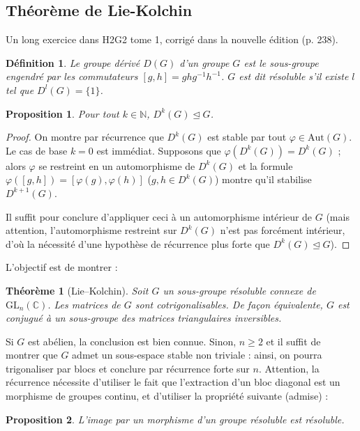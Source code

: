 \documentclass[a4paper, 11pt]{article}
\def\N{\mathbb{N}}
\def\C{\mathbb{C}}
\def\GL{\mathrm{GL}}
\def\Aut{\mathrm{Aut}}
\newtheorem*{definition}{Définition}
\newtheorem*{proposition}{Proposition}
\newtheorem*{theorem}{Théorème}
\begin{document}
\subsection{Théorème de Lie-Kolchin}

Un long exercice dans H2G2 tome 1, corrigé dans la nouvelle édition (p. 238).

\begin{definition}
  Le \emph{groupe dérivé} $D(G)$ d'un groupe $G$ est le sous-groupe engendré par
  les commutateurs $[g,h]= ghg^{-1}h^{-1}$. $G$ est dit \emph{résoluble} s'il
  existe $l$ tel que $D^l(G) = \{1\}$.
\end{definition}
\begin{proposition}
  Pour tout $k \in \N$, $D^k(G) \trianglelefteq G$.
\end{proposition}
\begin{proof}
  On montre par récurrence que $D^k(G)$ est stable par tout $\varphi \in
  \Aut(G)$. Le cas de base $k=0$ est immédiat. Supposons que $\varphi(D^k(G)) =
  D^k(G)$ ; alors $\varphi$ se restreint en un automorphisme de $D^k(G)$ et la
  formule $\varphi([g,h]) = [\varphi(g),\varphi(h)]$ ($g,h \in D^k(G)$) montre
  qu'il stabilise $D^{k+1}(G)$.

  Il suffit pour conclure d'appliquer ceci à un automorphisme intérieur de $G$
  (mais attention, l'automorphisme restreint sur $D^k(G)$ n'est pas forcément
  intérieur, d'où la nécessité d'une hypothèse de récurrence plus forte que
  $D^k(G) \trianglelefteq G$).
\end{proof}


L'objectif est de montrer :

\begin{theorem}[Lie--Kolchin]
  Soit $G$ un sous-groupe résoluble connexe de $\GL_n(\C)$. Les matrices de $G$
  sont cotrigonalisables. De façon équivalente, $G$ est conjugué à un
  sous-groupe des matrices triangulaires inversibles.
\end{theorem}

Si $G$ est abélien, la conclusion est bien connue. Sinon, $n \geq 2$ et il
suffit de montrer que $G$ admet un sous-espace stable non triviale : ainsi, on
pourra trigonaliser par blocs et conclure par récurrence forte sur $n$.
Attention, la récurrence nécessite d'utiliser le fait que l'extraction d'un bloc
diagonal est un morphisme de groupes continu, et d'utiliser la propriété
suivante (admise) :
\begin{proposition}
  L'image par un morphisme d'un groupe résoluble est résoluble.
\end{proposition}
\end{document}
